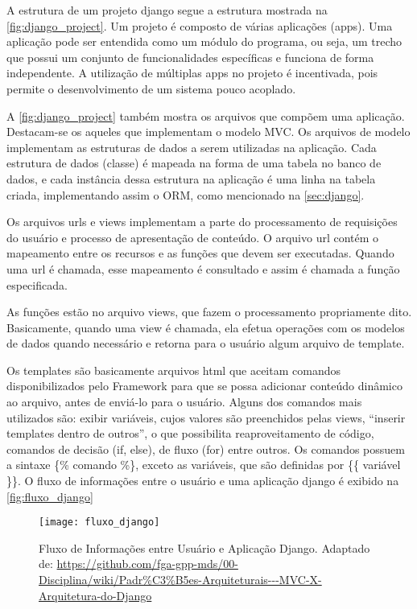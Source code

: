 	A estrutura de um projeto django segue a estrutura mostrada na \autoref{fig:django_project}. Um projeto é composto de várias aplicações (apps). Uma aplicação pode ser entendida como um módulo do programa, ou seja, um trecho que possui um conjunto de funcionalidades específicas e funciona de forma independente. A utilização de múltiplas apps no projeto é incentivada, pois permite o desenvolvimento de um sistema pouco acoplado.
	
	A \autoref{fig:django_project} também mostra os arquivos que compõem uma aplicação. Destacam-se os aqueles que implementam o modelo MVC. Os arquivos de modelo implementam as estruturas de dados a serem utilizadas na aplicação. Cada estrutura de dados (classe) é mapeada na forma de uma tabela no banco de dados, e cada instância dessa estrutura na aplicação é uma linha na tabela criada, implementando assim o ORM, como mencionado na \autoref{sec:django}.
	
	Os arquivos urls e views implementam a parte do processamento de requisições do usuário e processo de apresentação de conteúdo. O arquivo url contém o mapeamento entre os recursos e as funções que devem ser executadas. Quando uma url é chamada, esse mapeamento é consultado e assim é chamada a função especificada.
	
	As funções estão no arquivo views, que fazem o processamento propriamente dito. Basicamente, quando uma view é chamada, ela efetua operações com os modelos de dados quando necessário e retorna para o usuário algum arquivo de template.
	
	Os templates são basicamente arquivos html que aceitam comandos disponibilizados pelo Framework para que se possa adicionar conteúdo dinâmico ao arquivo, antes de enviá-lo para o usuário. Alguns dos comandos mais utilizados são: exibir variáveis, cujos valores são preenchidos pelas views, ``inserir templates dentro de outros'', o que possibilita reaproveitamento de código, comandos de decisão (if, else), de fluxo (for) entre outros. Os comandos possuem a sintaxe  \{\% comando \%\}, exceto as variáveis, que são definidas por \{\{ variável \}\}. O fluxo de informações entre o usuário e uma aplicação django é exibido na \autoref{fig:fluxo_django}
	
	\begin{figure}[!htb]	
		\captionsetup{justification=centering}
		\begin{center}
			\texttt{[image: fluxo\_django]}  %
			\caption[Fluxo de Informações entre Usuário e Aplicação Django]{\label{fig:fluxo_django}Fluxo de Informações entre Usuário e Aplicação Django. Adaptado de: \url{https://github.com/fga-gpp-mds/00-Disciplina/wiki/Padr\%C3\%B5es-Arquiteturais---MVC-X-Arquitetura-do-Django}}
		\end{center}		
	\end{figure}
	
